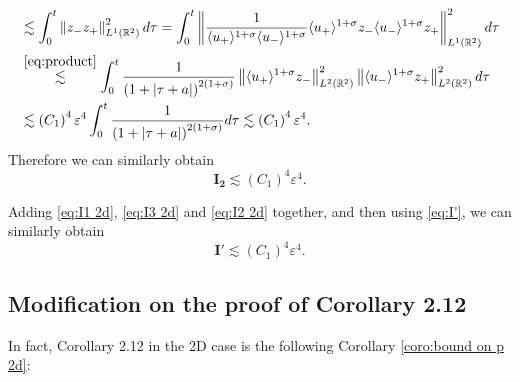 \documentclass[10pt,reqno]{amsart}
\numberwithin{equation}{section}
\begin{document}
\begin{appendix}
\begin{align*}
	&\lesssim \int_{0}^{t}\left\|z_{-} z_{+}\right\|_{L^1(\mathbb{R}^2)}^2d\tau
=\int_{0}^{t}\left\|\frac{1}{\langle u_{+}\rangle^{{1+\sigma}}\langle u_{-}\rangle^{{1+\sigma}}}\langle u_{+}\rangle^{{1+\sigma}}z_{-}\langle u_{-}\rangle^{{1+\sigma}} z_{+}\right\|_{L^1(\mathbb{R}^2)}^2d\tau\\
	&\stackrel{\eqref{eq:product}}{\lesssim}  \int_{0}^{t}\frac{1}{\left(1+\left|\tau+a\right|\right)^{2(1+\sigma)}}\left\|\langle u_{+}\rangle^{{1+\sigma}}z_{-}\right\|_{L^2(\mathbb{R}^2)}^2\left\|\langle u_{-}\rangle^{{1+\sigma}}z_{+}\right\|_{L^2(\mathbb{R}^2)}^2d\tau\\
	&\lesssim \left(C_1\right)^4\varepsilon^4\int_{0}^{t}\frac{1}{\left(1+\left|\tau+a\right|\right)^{2(1+\sigma)}}d\tau	\lesssim \left(C_1\right)^4\varepsilon^4.
\end{align*}
Therefore we can similarly obtain
\begin{equation}\label{eq:I2 2d}
	\mathbf{I_2}\lesssim \left(C_1\right)^4\varepsilon^4.
\end{equation}

Adding \eqref{eq:I1 2d}, \eqref{eq:I3 2d} and \eqref{eq:I2 2d} together, and then using \eqref{eq:I'}, we can similarly obtain
\begin{equation*}
	\mathbf{I'}\lesssim \left(C_1\right)^4\varepsilon^4.
\end{equation*}



\subsection{Modification on the proof of Corollary 2.12}

In fact, Corollary 2.12 \cite{Li-Yu} in the 2D case is the following Corollary \ref{coro:bound on p 2d}:


\end{appendix}
\end{document}
